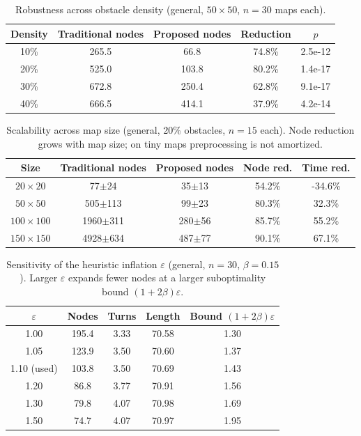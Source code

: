 \begin{table}[htbp]\centering
\caption{Robustness across obstacle density (general, $50\times50$, $n=30$ maps each).}
\label{tab:robust_density}
\begin{tabular}{ccccc}\toprule
Density & Traditional nodes & Proposed nodes & Reduction & $p$ \\\midrule
10\% & 265.5 & 66.8 & 74.8\% & 2.5e-12 \\
20\% & 525.0 & 103.8 & 80.2\% & 1.4e-17 \\
30\% & 672.8 & 250.4 & 62.8\% & 9.1e-17 \\
40\% & 666.5 & 414.1 & 37.9\% & 4.2e-14 \\
\bottomrule\end{tabular}\end{table}

\begin{table}[htbp]\centering
\caption{Scalability across map size (general, 20\% obstacles, $n=15$ each). Node reduction grows with map size; on tiny maps preprocessing is not amortized.}
\label{tab:scalability}
\begin{tabular}{ccccc}\toprule
Size & Traditional nodes & Proposed nodes & Node red. & Time red. \\\midrule
$20\times20$ & 77$\pm$24 & 35$\pm$13 & 54.2\% & -34.6\% \\
$50\times50$ & 505$\pm$113 & 99$\pm$23 & 80.3\% & 32.3\% \\
$100\times100$ & 1960$\pm$311 & 280$\pm$56 & 85.7\% & 55.2\% \\
$150\times150$ & 4928$\pm$634 & 487$\pm$77 & 90.1\% & 67.1\% \\
\bottomrule\end{tabular}\end{table}

\begin{table}[htbp]\centering
\caption{Sensitivity of the heuristic inflation $\varepsilon$ (general, $n=30$, $\beta=0.15$). Larger $\varepsilon$ expands fewer nodes at a larger suboptimality bound $(1+2\beta)\varepsilon$.}
\label{tab:sens_eps}
\begin{tabular}{ccccc}\toprule
$\varepsilon$ & Nodes & Turns & Length & Bound $(1+2\beta)\varepsilon$ \\\midrule
1.00 & 195.4 & 3.33 & 70.58 & 1.30 \\
1.05 & 123.9 & 3.50 & 70.60 & 1.37 \\
1.10 (used) & 103.8 & 3.50 & 70.69 & 1.43 \\
1.20 & 86.8 & 3.77 & 70.91 & 1.56 \\
1.30 & 79.8 & 4.07 & 70.98 & 1.69 \\
1.50 & 74.7 & 4.07 & 70.97 & 1.95 \\
\bottomrule\end{tabular}\end{table}

